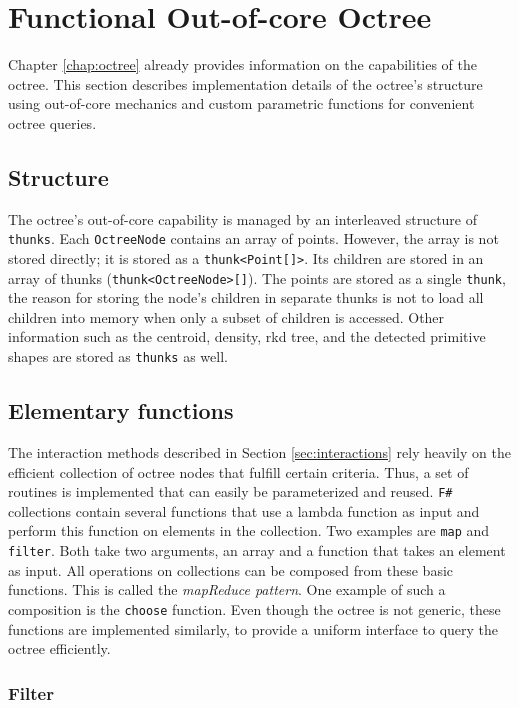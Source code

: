 \section{Functional Out-of-core Octree}
\label{sec:funcOctree}

Chapter \ref{chap:octree} already provides information on the capabilities of the octree. This section describes implementation details of the octree's structure using out-of-core mechanics and custom parametric functions for convenient octree queries. 


\subsection{Structure}

The octree's out-of-core capability is managed by an interleaved structure of \verb|thunks|. Each \verb|OctreeNode| contains an array of points. However, the array is not stored directly; it is stored as a \verb|thunk<Point[]>|. Its children are stored in an array of thunks (\verb|thunk<OctreeNode>[]|). The points are stored as a single \verb|thunk|, the reason for storing the node's children in separate thunks is not to load all children into memory when only a subset of children is accessed. Other information such as the centroid, density, rkd tree, and the detected primitive shapes are stored as \verb|thunks| as well. 


\subsection{Elementary functions}

The interaction methods described in Section \ref{sec:interactions} rely heavily on the efficient collection of octree nodes that fulfill certain criteria. Thus, a set of routines is implemented that can easily be parameterized and reused. \verb|F#| collections contain several functions that use a lambda function as input and perform this function on elements in the collection. Two examples are \verb|map| and \verb|filter|. Both take two arguments, an array and a function that takes an element as input. All operations on collections can be composed from these basic functions. This is called the \textit{mapReduce pattern}. One example of such a composition is the \verb|choose| function. Even though the octree is not generic, these functions are implemented similarly, to provide a uniform interface to query the octree efficiently. 


\subsubsection{Filter}

